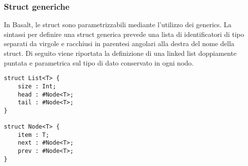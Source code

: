 \subsubsection{Struct generiche}
In Basalt, le struct sono parametrizzabili mediante l'utilizzo dei generics. La sintassi per definire una struct generica 
prevede una lista di identificatori di tipo separati da virgole e racchiusi in parentesi angolari alla destra del 
nome della struct. Di seguito viene riportata la definizione di una linked list doppiamente puntata e parametrica 
sul tipo di dato conservato in ogni nodo. \\

\vspace{0.5cm}
\begin{lstlisting}[frame=single]
struct List<T> {
    size : Int;
    head : #Node<T>;
    tail : #Node<T>;
}

struct Node<T> { 
    item : T;
    next : #Node<T>;
    prev : #Node<T>;
}
\end{lstlisting}
\vspace{0.5cm}